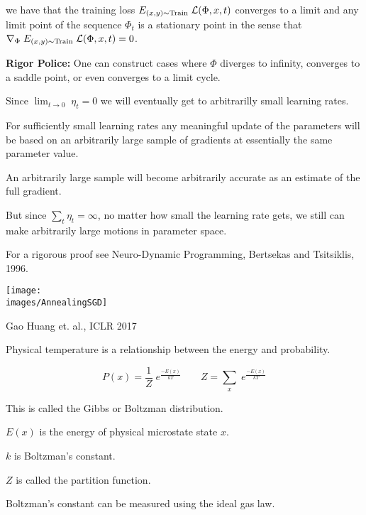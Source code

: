 {\vfill
we have that the training loss $E_{(x,y) \sim \mathrm{Train}}\; {\cal L}(\Phi,x,t)$ converges to a limit and any limit point of the sequence $\Phi_t$
is a stationary point in the sense that {\huge  $\nabla_\Phi \; E_{(x,y) \sim \mathrm{Train}} \;{\cal L}(\Phi,x,t) = 0$}.

\vfill
{\Large
\vfill
{\bf Rigor Police:} One can construct cases where $\Phi$ diverges to infinity, converges to a saddle point, or even converges to a limit cycle.

}


Since $\lim_{t \rightarrow 0} \;\eta_t = 0$ we will eventually get to arbitrarilly small learning rates.

\vfill
For sufficiently small learning rates any meaningful update of the parameters will be based on an arbitrarily large sample
of gradients at essentially the same parameter value.

\vfill
An arbitrarily large sample will become arbitrarily accurate as an estimate of the full gradient.

\vfill
But since $\sum_t \eta_t = \infty$, no matter how small the learning rate gets, we still can make arbitrarily large motions in parameter space.


\vfill
{\Large
\vfill
For a rigorous proof see Neuro-Dynamic Programming, Bertsekas and Tsitsiklis, 1996.}


\centerline{\texttt{[image: \\images/AnnealingSGD]}}
\centerline{\Large Gao Huang et. al., ICLR 2017}



Physical temperature is a relationship between the energy and probability.

\vfill
$$P(x) = \frac{1}{Z} \;e^{\frac{-E(x)}{kT}} \;\;\;\;\;\;\;Z = \sum_x\; e^{\frac{-E(x)}{kT}}$$

\vfill
This is called the Gibbs or Boltzman distribution.

\vfill
$E(x)$ is the energy of physical microstate state $x$.


\vfill
$k$ is Boltzman's constant.

\vfill
$Z$ is called the partition function.


Boltzman's constant can be measured using the ideal gas law.

}
